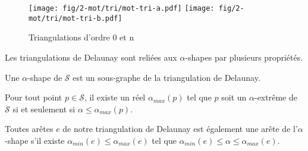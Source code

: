 \begin{figure}[H]
  \centering
  \texttt{[image: fig/2-mot/tri/mot-tri-a.pdf]}
  \texttt{[image: fig/2-mot/tri/mot-tri-b.pdf]}
  \caption{Triangulations d'ordre 0 et n}
\end{figure}


Les triangulations de Delaunay sont reliées aux $\alpha$-shapes par plusieurs propriétés. \cite{EdeKirSei83}

\begin{Lemma}
  Une $\alpha$-shape de $\mathcal{S}$ est un sous-graphe de la triangulation de Delaunay.
\end{Lemma}

\begin{Lemma}
  Pour tout point $p \in \mathcal{S}$, il existe un réel $\alpha_{max}(p)$ tel que $p$ soit un $\alpha$-extrême de $\mathcal{S}$ si et seulement si $\alpha \leq \alpha_{max}(p)$.
\end{Lemma}

\begin{Lemma}
  Toutes arêtes $e$ de notre triangulation de Delaunay est également une arête de l'$\alpha$-shape s'il existe $\alpha_{min}(e) \leq \alpha_{max}(e)$ tel que $\alpha_{min}(e) \leq \alpha \leq \alpha_{max}(e)$.
\end{Lemma}
